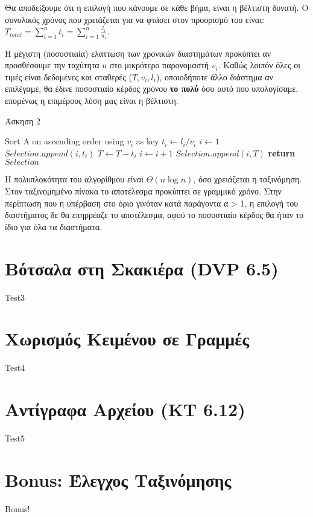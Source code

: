 \documentclass[a4paper,11pt]{article}
\begin{document}
Θα αποδείξουμε ότι η επιλογή που κάνουμε σε κάθε βήμα, είναι η βέλτιστη
δυνατή.
Ο συνολικός χρόνος που χρειάζεται για να φτάσει στον προορισμό του είναι: \\
$T_{total}=\displaystyle\sum\limits_{i=1}^n{t_i} =
\displaystyle\sum\limits_{i=1}^n{\frac{l_i}{u_i}}$.

Η μέγιστη (ποσοστιαία) ελάττωση των χρονικών διαστημάτων προκύπτει αν
προσθέσουμε την ταχύτητα u στο μικρότερο παρονομαστή $v_i$. Kαθώς λοιπόν
όλες οι τιμές είναι δεδομένες και σταθερές ($T, v_i, l_i$), οποιοδήποτε άλλο
διάστημα αν επιλέγαμε, θα έδινε ποσοστιαίο κέρδος χρόνου \textbf{το πολύ} όσο αυτό
που υπολογίσαμε, επομένως η επιμέρους λύση μας είναι η βέλτιστη.\\

\begin{algorithm}[H]
\caption{Άσκηση 2}
\begin{algorithmic}[1]
    \State Sort A on ascending order using $v_i$ as key
	\State $t_i \gets l_i / v_i$
    \EndFor
{}
    \State $i \gets 1$
	\State $Selection.append (i,t_i)$
	\State $T \gets T - t_i$
        \State $i \gets i+1$
    \EndWhile
    \State $Selection.append (i, T)$
    \State \textbf{return} $Selection$
\EndProcedure
\end{algorithmic}
\end{algorithm}

Η πολυπλοκότητα του αλγορίθμου είναι $\Theta(n\log{n})$, όσο χρειάζεται η
ταξινόμηση. Στον ταξινομημένο πίνακα το αποτέλεσμα προκύπτει σε γραμμικό
χρόνο.
Στην περίπτωση που η υπέρβαση στο όριο γινόταν κατά παράγοντα α > 1, η επιλογή
του διαστήματος δε θα επηρρέαζε το αποτέλεσμα, αφού το ποσοστιαίο κέρδος θα
ήταν το ίδιο για όλα τα διαστήματα.



\section{Βότσαλα στη Σκακιέρα (DVP 6.5)}
Test3


\section{Χωρισμός Κειμένου σε Γραμμές}
Test4


\section{Αντίγραφα Αρχείου (KT 6.12)}
Test5


\section{Bonus: Έλεγχος Ταξινόμησης}
Bonus!
\end{document}
